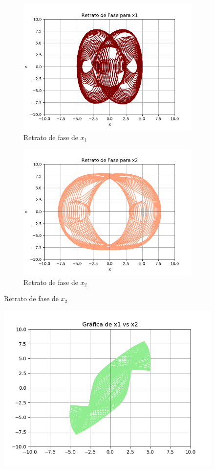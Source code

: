 \documentclass[12pt]{article}
\begin{document}
\begin{figure}[h!]
\begin{subfigure}{.55\textwidth}
  \centering
  \includegraphics[width=.8\linewidth]{Ej3_31.png}
  \caption{Retrato de fase de $x_1$}
  \label{fig:sfig2}
\end{subfigure}
\begin{subfigure}{.55\textwidth}
  \centering
  \includegraphics[width=.8\linewidth]{Ej3_32.png}
  \caption{Retrato de fase de $x_2$}
  \label{fig:sfig2}
\end{subfigure}
\end{figure}

\begin{figure}[h!]
    \centering
\includegraphics[width=5in]{Ej3_33.png}
\end{figure}
\end{document}
